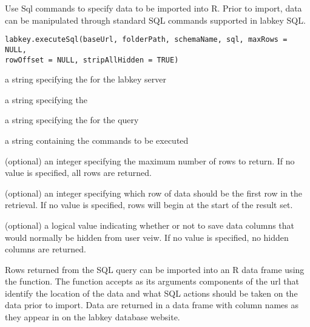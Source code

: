 \documentclass{article}
\begin{document}
\begin{Description}\relax
Use Sql commands to specify data to be imported into R. Prior to import, data can
be manipulated through standard SQL commands supported in labkey SQL.
\end{Description}
\begin{Usage}
\begin{verbatim}
labkey.executeSql(baseUrl, folderPath, schemaName, sql, maxRows = NULL, 
rowOffset = NULL, stripAllHidden = TRUE)
\end{verbatim}
\end{Usage}
\begin{Arguments}
\begin{ldescription}
\item[\code{baseUrl}] a string specifying the for the labkey server
\item[\code{folderPath}] a string specifying the  
\item[\code{schemaName}] a string specifying the   for the query
\item[\code{sql}] a string containing the  commands to be executed
\item[\code{maxRows}] (optional) an integer specifying the maximum number of rows to return. If no value is specified, all rows are returned.
\item[\code{rowOffset}] (optional) an integer specifying which row of data should be the first row in the retrieval. 
If no value is specified, rows will begin at the start of the result set.
\item[\code{stripAllHidden}] (optional) a logical value indicating whether or not to save data columns that would 
normally be hidden from user veiw. If no value is specified, no hidden columns are returned.
\end{ldescription}
\end{Arguments}
\begin{Details}\relax
Rows returned from the SQL query can be imported into an R data frame using the 
function. The function accepts as its arguments components of the url that identify the location of the
data and what SQL actions should be taken on the data prior to import. Data are returned in a data frame
with column names as they appear in on the labkey database website.
\end{Details}
\end{document}
